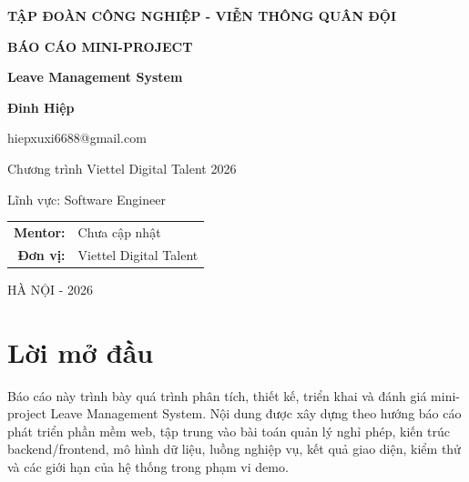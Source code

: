 \documentclass[12pt,a4paper,oneside]{extreport}
\makeatletter
\newcommand{\reporttitle}{Leave Management System}
\newcommand{\studentname}{Đinh Hiệp}
\newcommand{\studentemail}{hiepxuxi6688@gmail.com}
\newcommand{\mentorname}{Chưa cập nhật}
\newcommand{\unitname}{Viettel Digital Talent}
\makeatother
\begin{document}
\hypersetup{pageanchor=false}
\fontsize{13pt}{16.9pt}\selectfont

\begin{titlepage}
  \centering

  {\bfseries TẬP ĐOÀN CÔNG NGHIỆP - VIỄN THÔNG QUÂN ĐỘI\par}
  \vspace{1.2cm}

  {\Large \bfseries BÁO CÁO MINI-PROJECT\par}
  \vspace{1.5cm}

  {\Huge \bfseries \reporttitle\par}
  \vspace{1.5cm}

  {\Large \bfseries \studentname\par}
  \vspace{0.3cm}
  {\large \studentemail\par}

  \vfill

  {\large Chương trình Viettel Digital Talent 2026\par}
  \vspace{0.3cm}
  {\large Lĩnh vực: Software Engineer\par}

  \vspace{1.2cm}

  \begin{tabular}{rl}
    \textbf{Mentor:} & \mentorname \\
    \textbf{Đơn vị:} & \unitname \\
  \end{tabular}

  \vfill

  {\large HÀ NỘI - 2026\par}
\end{titlepage}

\hypersetup{pageanchor=true}

\chapter*{Lời mở đầu}
Báo cáo này trình bày quá trình phân tích, thiết kế, triển khai và đánh giá mini-project Leave Management System. Nội dung được xây dựng theo hướng báo cáo phát triển phần mềm web, tập trung vào bài toán quản lý nghỉ phép, kiến trúc backend/frontend, mô hình dữ liệu, luồng nghiệp vụ, kết quả giao diện, kiểm thử và các giới hạn của hệ thống trong phạm vi demo.
\end{document}
